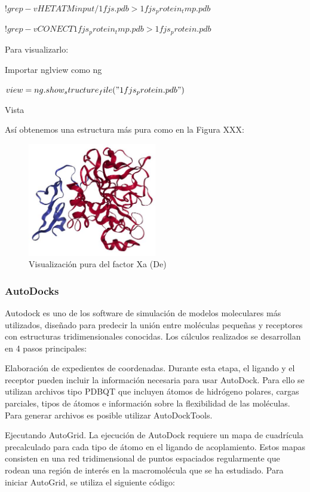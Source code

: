 \documentclass[11pt, letterpaper, spanish]{article}
\begin{document}
{{\par{$!grep -v HETATM input/1fjs.pdb > 1fjs_protein_tmp.pdb$}
\par{$!grep -v CONECT 1fjs_protein_tmp.pdb > 1fjs_protein.pdb$}
\par{Para visualizarlo:}
\par{Importar nglview como ng}
\par{$view = ng.show_structure_file("1fjs_protein.pdb")$}
\par{Vista}
\par{Así obtenemos una estructura más pura como en la Figura XXX:}
\begin{figure}
	    \centering
		\caption{Visualización pura del factor Xa (De\cite{Villa_2017})}
		\includegraphics[width=0.5\textwidth]{ProteinaPura.JPG}
	\end{figure}

\subsubsection{AutoDocks}
\par{Autodock es uno de los software de simulación de modelos moleculares más utilizados, diseñado para predecir la unión entre moléculas pequeñas y receptores con estructuras tridimensionales conocidas. Los cálculos realizados se desarrollan en 4 pasos principales:}
\vspace{0.4 cm}

\par{Elaboración de expedientes de coordenadas.
Durante esta etapa, el ligando y el receptor pueden incluir la información necesaria para usar AutoDock. Para ello se utilizan archivos tipo PDBQT que incluyen átomos de hidrógeno polares, cargas parciales, tipos de átomos e información sobre la flexibilidad de las moléculas. Para generar archivos es posible utilizar AutoDockTools.}
\par{Ejecutando AutoGrid.
 La ejecución de AutoDock requiere un mapa de cuadrícula precalculado para cada tipo de átomo en el ligando de acoplamiento. Estos mapas consisten en una red tridimensional de puntos espaciados regularmente que rodean una región de interés en la macromolécula que se ha estudiado. Para iniciar AutoGrid, se utiliza el siguiente código:}

}}
\end{document}
